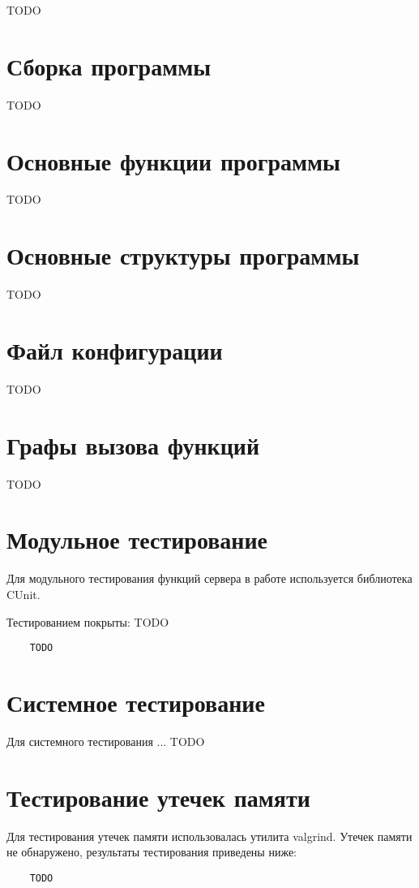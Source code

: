 \documentclass[a4paper,12pt]{report}
\begin{document}
TODO

\section{Сборка программы}
TODO

\section{Основные функции программы}
TODO

\section{Основные структуры программы}
TODO

\section{Файл конфигурации}
TODO

\section{Графы вызова функций}
TODO

\section{Модульное тестирование}

Для модульного тестирования функций сервера в работе используется библиотека CUnit.

Тестированием покрыты: TODO
\begin{verbatim}
    TODO
\end{verbatim}


\section{Системное тестирование}

Для системного тестирования ...
TODO

\section{Тестирование утечек памяти}

Для тестирования утечек памяти использовалась утилита valgrind. Утечек памяти не обнаружено, результаты тестирования приведены ниже: 
\begin{verbatim}
    TODO
\end{verbatim}
\end{document}
